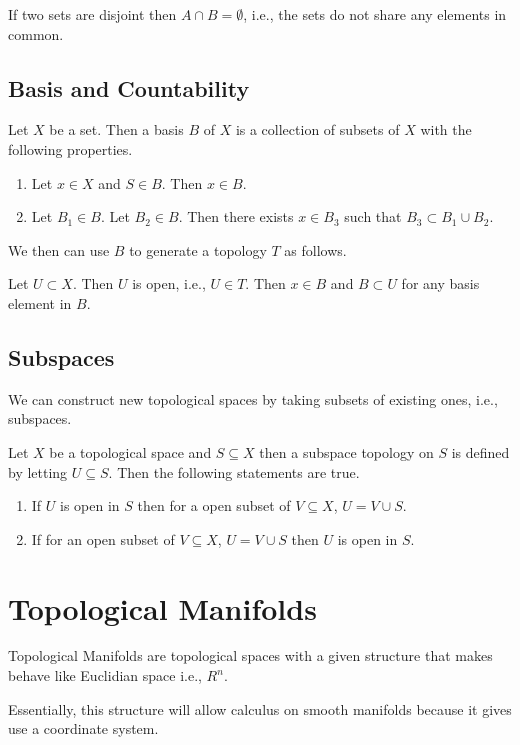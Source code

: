 \documentclass{article}
\begin{document}
If two sets are disjoint then $ A \cap B = \emptyset $, i.e., the sets do not share any elements in common.
\subsection{Basis and Countability}

Let $ X $ be a set. Then a basis $ B $ of $ X $ is a collection of subsets of $ X $ with the following
properties.

\begin{enumerate}
\item Let $ x \in X $ and $ S \in B $. Then $ x \in B $.
\item Let $ B_{1} \in B $. Let $ B_{2} \in B $. Then there exists  $ x \in B_{3} $ such that $ B_{3} \subset B_{1} \cup B_{2} $.
\end{enumerate}

We then can use $ B $ to generate a topology $ T $ as follows.

Let $ U \subset X $. Then $ U $ is open, i.e., $ U \in T $. Then  $ x \in B $ and $ B \subset U $ for any basis element in $ B $.

\subsection{Subspaces}

We can construct new topological spaces by taking subsets of existing ones, i.e., subspaces.

Let $ X $ be a topological space and $ S \subseteq X $ then a subspace topology on $ S $ is defined
by letting  $ U \subseteq  S $. Then the following statements are true.

\begin{enumerate}
\item If $ U $ is open in $ S $ then for a open subset of $ V \subseteq X $, $ U =  V \cup  S $.
\item If for an open subset of $ V \subseteq X $, $ U =  V \cup  S $ then  $ U $ is open in $ S $.
\end{enumerate}

\section{Topological Manifolds}

Topological Manifolds are topological spaces with a given structure that makes behave like Euclidian space i.e., $ R^n $.

Essentially, this structure will allow calculus on smooth manifolds because it gives use a coordinate system.
\end{document}
